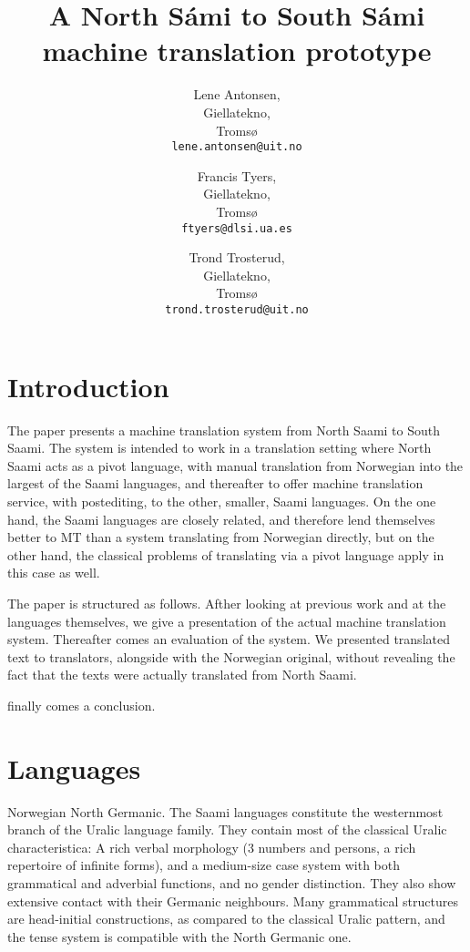 \documentclass[a4paper,11pt,twocolumn]{article}
\title{A North Sámi to South Sámi machine translation prototype}
\author{Lene Antonsen,\\Giellatekno,\\Tromsø\\{\tt lene.antonsen@uit.no}
\and Francis Tyers,\\Giellatekno,\\Tromsø\\{\tt ftyers@dlsi.ua.es}
\and Trond Trosterud,\\Giellatekno,\\Tromsø\\{\tt trond.trosterud@uit.no}}
\date{}
\begin{document}
\maketitle

\section{Introduction}

The paper presents a machine translation system from North Saami to
South Saami. The system is intended to work in a translation setting
where North Saami acts as a pivot language, with manual translation
from Norwegian into the largest of the Saami languages, and thereafter
to offer machine translation service, with postediting, to the other,
smaller, Saami languages. On the one hand, the Saami languages are
closely related, and therefore lend themselves better to MT than a
system translating from Norwegian directly, but on the other hand, the
classical problems of translating via a pivot language apply in this
case as well. 

The paper is structured as follows. Afther looking at previous work
and at the languages themselves, we give a presentation of the actual
machine translation system. Thereafter comes an evaluation of the
system. We presented translated text to translators, alongside with
the Norwegian original, without revealing the fact that the texts were
actually translated from North Saami.

finally comes a conclusion.


\cite{tyers09} \cite{wiechetek10} \cite{trosterud12}


\section{Languages}

Norwegian North Germanic. The Saami languages constitute the
westernmost branch of the Uralic language family. They contain most of
the classical Uralic characteristica: A rich verbal morphology (3
numbers and persons, a rich repertoire of infinite forms), and a
medium-size case system with both grammatical and adverbial functions,
and no gender distinction. They also show extensive contact with their
Germanic neighbours. Many grammatical structures are head-initial
constructions, as compared to the classical Uralic pattern, and the
tense system is compatible with the North Germanic one.
\end{document}
